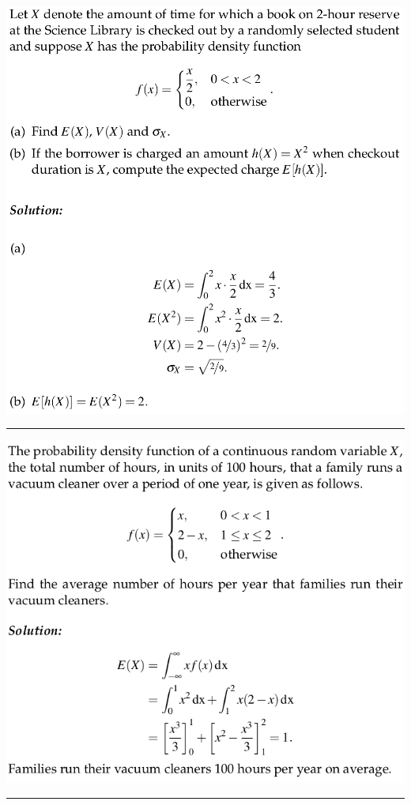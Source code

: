 \documentclass[a4paper, 12pt]{article}
\begin{document}
\begin{multicols*}{3}
\includegraphics[scale=0.26]{pdf-find-e-v-sd.png}
\noindent\rule{\columnwidth}{0.5pt}
\includegraphics[scale=0.35]{pdf-find-e.png}
\noindent\rule{\columnwidth}{0.5pt}
%

\end{multicols*}
\end{document}
